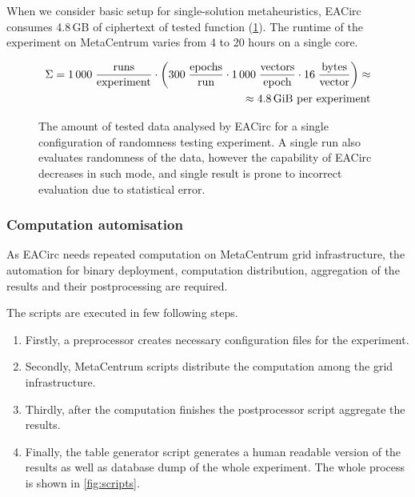 \documentclass[
  print, %
  Table,   %
  nolof,     %
  nolot,     %
  11pt, %
  oneside  %
]{fithesis3}
\begin{document}
When we consider basic setup for single-solution metaheuristics, EACirc consumes 4.8\,GB of ciphertext of tested function (\cref{fig:dataUsage}). The runtime of the experiment on MetaCentrum varies from 4 to 20 hours on a single core.

\begin{figure}[t]
    \begin{equation*}
        \begin{aligned}
    \Sigma = 1\,000 \;
             \frac{\textnormal{runs}}
                  {\textnormal{experiment}}
             \cdot
             \left(
             300 \;
             \frac{\textnormal{epochs}}
                  {\textnormal{run}}
             \cdot
             1\,000 \;
             \frac{\textnormal{vectors}}
                  {\textnormal{epoch}}
             \cdot
             16 \;
             \frac{\textnormal{bytes}}
                  {\textnormal{vector}}
             \right) \approx\\
             \approx 4.8 \textnormal{\,GiB per experiment}
        \end{aligned}
    \end{equation*}
    \caption{The amount of tested data analysed by EACirc for a single configuration of randomness testing experiment. A single run also evaluates randomness of the data, however the capability of EACirc decreases in such mode, and single result is prone to incorrect evaluation due to statistical error.}
    \label{fig:dataUsage}
\end{figure}


\subsubsection{\textbf{Computation automisation}}
\label{subsubsec:method-spec-ss-auto}

As EACirc needs repeated computation on MetaCentrum grid infrastructure, the automation for binary deployment, computation distribution, aggregation of the results and their postprocessing are required.

The scripts are executed in few following steps.

\begin{enumerate}[noitemsep,topsep=3pt,parsep=3pt,partopsep=3pt]
 \item Firstly, a preprocessor creates necessary configuration files for the experiment.
 \item Secondly, MetaCentrum scripts distribute the computation among the grid infrastructure.
 \item Thirdly, after the computation finishes the postprocessor script aggregate the results. 
 \item Finally, the table generator script generates a human readable version of the results as well as database dump of the whole experiment. The whole process is shown in \cref{fig:scripts}.
\end{enumerate}
\end{document}
